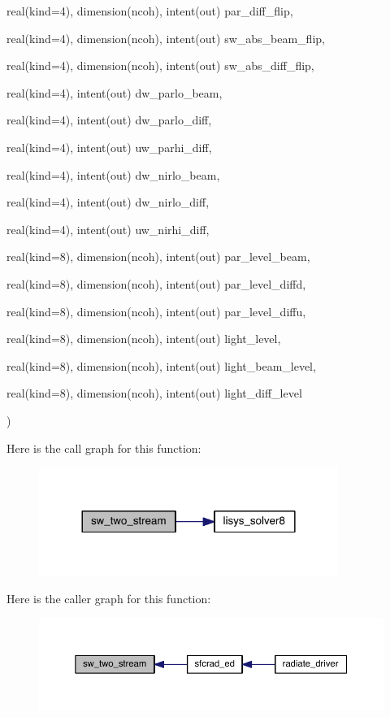 {\begin{DoxyParamCaption}
\item[{real(kind=4), dimension(ncoh), intent(out)}]{par\+\_\+diff\+\_\+flip, }
\item[{real(kind=4), dimension(ncoh), intent(out)}]{sw\+\_\+abs\+\_\+beam\+\_\+flip, }
\item[{real(kind=4), dimension(ncoh), intent(out)}]{sw\+\_\+abs\+\_\+diff\+\_\+flip, }
\item[{real(kind=4), intent(out)}]{dw\+\_\+parlo\+\_\+beam, }
\item[{real(kind=4), intent(out)}]{dw\+\_\+parlo\+\_\+diff, }
\item[{real(kind=4), intent(out)}]{uw\+\_\+parhi\+\_\+diff, }
\item[{real(kind=4), intent(out)}]{dw\+\_\+nirlo\+\_\+beam, }
\item[{real(kind=4), intent(out)}]{dw\+\_\+nirlo\+\_\+diff, }
\item[{real(kind=4), intent(out)}]{uw\+\_\+nirhi\+\_\+diff, }
\item[{real(kind=8), dimension(ncoh), intent(out)}]{par\+\_\+level\+\_\+beam, }
\item[{real(kind=8), dimension(ncoh), intent(out)}]{par\+\_\+level\+\_\+diffd, }
\item[{real(kind=8), dimension(ncoh), intent(out)}]{par\+\_\+level\+\_\+diffu, }
\item[{real(kind=8), dimension(ncoh), intent(out)}]{light\+\_\+level, }
\item[{real(kind=8), dimension(ncoh), intent(out)}]{light\+\_\+beam\+\_\+level, }
\item[{real(kind=8), dimension(ncoh), intent(out)}]{light\+\_\+diff\+\_\+level}
\end{DoxyParamCaption}
)}\label{twostream__rad_8f90_abe93885fe642dcef8db1fb3977179585}


Here is the call graph for this function\+:\nopagebreak
\begin{figure}[H]
\begin{center}
\leavevmode
\includegraphics[width=276pt]{twostream__rad_8f90_abe93885fe642dcef8db1fb3977179585_cgraph}
\end{center}
\end{figure}




Here is the caller graph for this function\+:\nopagebreak
\begin{figure}[H]
\begin{center}
\leavevmode
\includegraphics[width=350pt]{twostream__rad_8f90_abe93885fe642dcef8db1fb3977179585_icgraph}
\end{center}
\end{figure}


